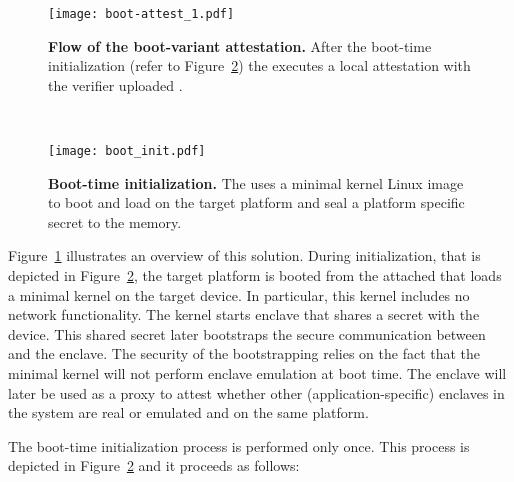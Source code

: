 \begin{figure*}[t!]
    \centering
    \begin{subfigure}[t]{0.5\textwidth}
        \centering
        \texttt{[image: boot-attest\_1.pdf]}
        \caption{\textbf{Flow of the boot-variant attestation.} After the boot-time initialization (refer to Figure~\ref{fig:boot-init}) the \nameclave executes a local attestation with the verifier uploaded \app. }
        \label{fig:boot-attest}
    \end{subfigure}%
    ~ ~~
    \begin{subfigure}[t]{0.5\textwidth}
        \centering
        \texttt{[image: boot\_init.pdf]}
        \caption{\textbf{Boot-time initialization.} The \device uses a minimal kernel Linux image to boot and load \nameclave on the target platform and seal a platform specific secret to the \device memory.}
        \label{fig:boot-init}
    \end{subfigure}
    \caption{\textbf{Attestation variant 2: boot-variant attestation.}}
\end{figure*}

\fi



Figure~\ref{fig:boot-attest} illustrates an overview of this solution. During initialization, that is depicted in Figure~\ref{fig:boot-init}, the target platform is booted from the attached \device that loads a minimal \name kernel on the target device. In particular, this kernel includes no network functionality. The kernel starts \name enclave that shares a secret with the device. This shared secret later bootstraps the secure communication between \device and the \name enclave. The security of the bootstrapping relies on the fact that the minimal kernel will not perform enclave emulation at boot time. The \name enclave will later be used as a proxy to attest whether other (application-specific) enclaves in the system are real or emulated and on the same platform.

\ifusenix
\vspace{-15pt}
\else
\fi

 The boot-time initialization process is performed only once.
This process is depicted in Figure~\ref{fig:boot-init} and it proceeds as follows:



